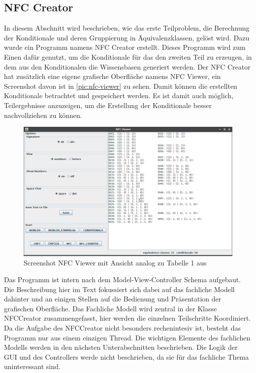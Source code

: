 \documentclass[12pt,a4paper]{article}
\begin{document}
\subsection{NFC Creator}
In diesem Abschnitt wird beschrieben, wie das erste Teilproblem, die Berechnung der Konditionale und deren Gruppierung in Äquivalenzklassen, gelöst wird. Dazu wurde ein Programm namens NFC Creator erstellt. Dieses Programm wird zum Einen dafür genutzt, um die Konditionale für das den zweiten Teil zu erzeugen, in dem aus den Konditionalen die Wissensbasen generiert werden. Der NFC Creator hat zusätzlich eine eigene grafische Oberfläche namens NFC Viewer, ein Screenshot davon ist in \autoref{pic:nfc-viewer} zu sehen. Damit können die erstellten Konditionale betrachtet und gespeichert werden. Es ist damit auch möglich, Teilergebnisse anzuzeigen, um die Erstellung der Konditionale besser nachvollziehen zu können. \\
\begin{figure}
\includegraphics[width=0.8\linewidth]{bilder/nfc-viewer.png}

\caption{Screenshot NFC Viewer mit Ansicht analog zu Tabelle 1 aus \cite{beierle19}}
\label{pic:nfc-viewer}
\end{figure}
Das Programm ist intern nach dem Model-View-Controller Schema aufgebaut. Die Beschreibung hier im Text fokussiert sich dabei auf das fachliche Modell dahinter und an einigen Stellen auf die Bedienung und Präsentation der grafischen Oberfläche. Das Fachliche Modell wird zentral in der Klasse NFCCreator zusammengefasst, hier werden die einzelnen Teilschritte Koordiniert. Da die Aufgabe des NFCCreator nicht besonders rechenintesiv ist, besteht das Programm nur aus einem einzigen Thread. Die wichtigen Elemente des fachlichen Modells werden in den nächsten Unterabschnitten beschrieben. Die Logik der GUI und des Controllers werde nicht beschrieben, da sie für das fachliche Thema uninteressant sind. \\
\end{document}
